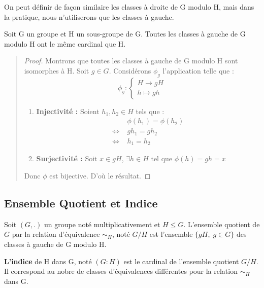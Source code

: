 \begin{remark}
    On peut définir de façon similaire les classes à droite de G modulo H, mais dans la pratique, nous n'utiliserons que les classes à gauche. 
\end{remark}

\begin{prop}
    Soit G un groupe et H un sous-groupe de G. Toutes les classes à gauche de G modulo H ont le même cardinal que H.
\end{prop}

\begin{quote}
	\footnotesize
	\begin{proof}
        Montrons que toutes les classes à gauche de G modulo H sont isomorphes à H.
		Soit $g \in G$. Considérons $\phi_g$ l'application telle que  :
            \[ \phi_g :
                \begin{cases}
                    H \longrightarrow gH \\
                    h \longmapsto gh 
                \end{cases}
            \] 
        \begin{enumerate}
            \item \textbf{Injectivité :} Soient $h_1,h_2 \in H$ tels que :
                \begin{align*}
                    & \phi(h_1) = \phi(h_2) \\
                    \Longleftrightarrow \; & g h_1 = g h_2 \\ 
                    \Longleftrightarrow \; & h_1 = h_2
                \end{align*}
            \item \textbf{Surjectivité :} Soit $x \in gH$, $ \exists h \in H$ tel que $\phi(h) = gh = x$
        \end{enumerate}
        Donc $\phi$ est bijective. D'où le résultat. 
    \end{proof}
	\normalsize
\end{quote}

\newpage 
\subsection{Ensemble Quotient et Indice}

\begin{definition}
    Soit $(G,.)$ un groupe noté multiplicativement et $H \leq G$. L'ensemble quotient de $G$ par la relation d'équivalence 
    $\sim_H$, noté $G/H$ est l'ensemble $\{gH, \; g \in G\}$ des classes à gauche de G modulo H. 

    \vspace{0.5cm}

    \textbf{L'indice} de H dans G, noté $(G:H)$ est le cardinal de l'ensemble quotient $G/H$.
    Il correspond au nobre de classes d'équivalences différentes pour la relation $\sim_H$ dans G. 
\end{definition}

